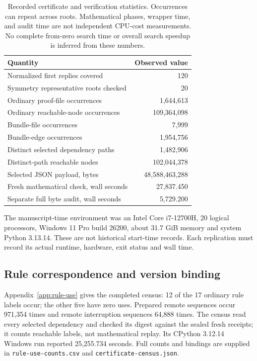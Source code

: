 \documentclass[11pt]{article}
\theoremstyle{definition}
\theoremstyle{remark}
\newcommand{\code}[1]{\texttt{#1}}
\begin{document}
\begin{table}[ht]
\centering
\begin{tabular}{lr}
\toprule Quantity & Observed value\\\midrule
Normalized first replies covered & 120\\
Symmetry representative roots checked & 20\\
Ordinary proof-file occurrences & 1,644,613\\
Ordinary reachable-node occurrences & 109,364,098\\
Bundle-file occurrences & 7,999\\
Bundle-edge occurrences & 1,954,756\\
Distinct selected dependency paths & 1,482,906\\
Distinct-path reachable nodes & 102,044,378\\
Selected JSON payload, bytes & 48,588,463,288\\
Fresh mathematical check, wall seconds & 27,837.450\\
Separate full byte audit, wall seconds & 5,729.200\\
\bottomrule
\end{tabular}
\caption{Recorded certificate and verification statistics. Occurrences can
repeat across roots. Mathematical phases, wrapper time, and audit time
are not independent CPU-cost measurements. No complete from-zero search
time or overall search speedup is inferred from these numbers.}
\label{tab:counts}
\end{table}

The manuscript-time environment was an Intel Core i7-12700H, 20 logical
processors, Windows 11 Pro build 26200, about 31.7 GiB memory and system
Python 3.13.14. These are not historical start-time records. Each replication
must record its actual runtime, hardware, exit status and wall time.


\subsection{Rule correspondence and version binding}
Appendix~\ref{app:rule-use} gives the completed census: 12 of the 17
ordinary rule labels occur; the other five have zero uses. Prepared remote
sequences occur 971,354 times and remote interruption sequences 64,888 times.
The census read every selected dependency and checked its digest against the
sealed fresh receipts; it counts reachable labels, not mathematical replay.
Its CPython 3.12.14 Windows run reported 25,255.734 seconds. Full counts and
bindings are supplied in \code{rule-use-counts.csv} and \code{certificate-census.json}.
\end{document}
